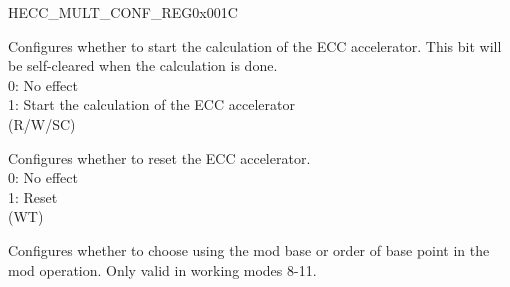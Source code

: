 \begin{register}{H}{ECC\_MULT\_CONF\_REG}{0x001C}\label{regdesc:ECCMULTCONFREG}
%
%
%
%
%
%
\regnewline%
\begin{regdesc}\begin{reglist}
\label{fielddesc:ECCMULTSTART}\item [ECC\_MULT\_START] Configures whether to start the calculation of the ECC accelerator. This bit will be self-cleared when the calculation is done. \\
0: No effect\\
1: Start the calculation of the ECC accelerator\\
(R/W/SC)
\label{fielddesc:ECCMULTRESET}\item [ECC\_MULT\_RESET] Configures whether to reset the ECC accelerator. \\
0: No effect\\
1: Reset\\
(WT)
%
\label{fielddesc:ECCMULTMODBASE}\item [ECC\_MULT\_MOD\_BASE] Configures whether to choose using the mod base or order of base point in the mod operation. Only valid in working modes 8-11. \\

\end{reglist}
\end{regdesc}
\end{register}
